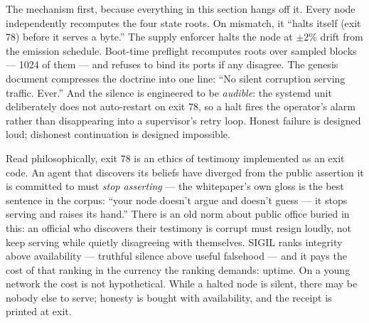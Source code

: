 \documentclass[10pt,a4paper]{article}
\begin{document}
The mechanism first, because everything in this section hangs off it. Every node
independently recomputes the four state roots. On mismatch, it ``halts itself (exit
78) before it serves a byte.'' The supply enforcer halts the node at $\pm$2\% drift
from the emission schedule. Boot-time preflight recomputes roots over sampled
blocks — 1024 of them — and refuses to bind its ports if any disagree. The genesis
document compresses the doctrine into one line: ``No silent corruption serving
traffic. Ever.'' And the silence is engineered to be \emph{audible}: the systemd unit
deliberately does not auto-restart on exit 78, so a halt fires the operator's alarm
rather than disappearing into a supervisor's retry loop. Honest failure is designed
loud; dishonest continuation is designed impossible.

Read philosophically, exit 78 is an ethics of testimony implemented as an exit
code. An agent that discovers its beliefs have diverged from the public assertion
it is committed to must \emph{stop asserting} — the whitepaper's own gloss is the
best sentence in the corpus: ``your node doesn't argue and doesn't guess — it stops
serving and raises its hand.'' There is an old norm about public office buried in
this: an official who discovers their testimony is corrupt must resign loudly, not
keep serving while quietly disagreeing with themselves. SIGIL ranks integrity above
availability — truthful silence above useful falsehood — and it pays the cost of
that ranking in the currency the ranking demands: uptime. On a young network the
cost is not hypothetical. While a halted node is silent, there may be nobody else
to serve; honesty is bought with availability, and the receipt is printed at exit.
\end{document}
